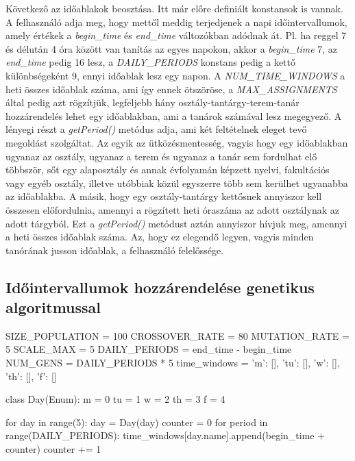 \documentclass[12pt,a4paper]{report}
\begin{document}
Következő az időablakok beosztása. Itt már előre definiált konstansok is vannak. A felhasználó adja meg, hogy mettől meddig terjedjenek a napi időintervallumok, amely értékek a \textit{begin\_time} és \textit{end\_time} változókban adódnak át. Pl. ha reggel 7 és délután 4 óra között van tanítás az egyes napokon, akkor a \textit{begin\_time} 7, az \textit{end\_time} pedig 16 lesz, a \textit{DAILY\_PERIODS} konstans pedig a kettő különbségeként 9, ennyi időablak lesz egy napon. A \textit{NUM\_TIME\_WINDOWS} a heti összes időablak száma, ami így ennek ötszöröse, a \textit{MAX\_ASSIGNMENTS} által pedig azt rögzítjük, legfeljebb hány osztály-tantárgy-terem-tanár hozzárendelés lehet egy időablakban, ami a tanárok számával lesz megegyező. A lényegi részt a \textit{getPeriod()} metódus adja, ami két feltételnek eleget tevő megoldást szolgáltat. Az egyik az ütközésmentesség, vagyis hogy egy időablakban ugyanaz az osztály, ugyanaz a terem és ugyanaz a tanár sem fordulhat elő többször, sőt egy alaposztály és annak évfolyamán képzett nyelvi, fakultációs vagy egyéb osztály, illetve utóbbiak közül egyszerre több sem kerülhet ugyanabba az időablakba. A másik, hogy egy osztály-tantárgy kettősnek annyiszor kell összesen előfordulnia, amennyi a rögzített heti óraszáma az adott osztálynak az adott tárgyból. Ezt a \textit{getPeriod()} metódust aztán annyiszor hívjuk meg, amennyi a heti összes időablak száma. Az, hogy ez elegendő legyen, vagyis minden tanórának jusson időablak, a felhasználó felelőssége.

\subsection{Időintervallumok hozzárendelése genetikus algoritmussal}

\begin{python}
SIZE_POPULATION = 100
CROSSOVER_RATE = 80
MUTATION_RATE = 5
SCALE_MAX = 5
DAILY_PERIODS = end_time - begin_time
NUM_GENS = DAILY_PERIODS * 5
time_windows = {'m': [], 'tu': [], 'w': [], 'th': [], 'f': []}


class Day(Enum):
    m = 0
    tu = 1
    w = 2
    th = 3
    f = 4


for day in range(5):
    day = Day(day)
    counter = 0
    for period in range(DAILY_PERIODS):
        time_windows[day.name].append(begin_time + counter)
        counter += 1
\end{python}
\end{document}
